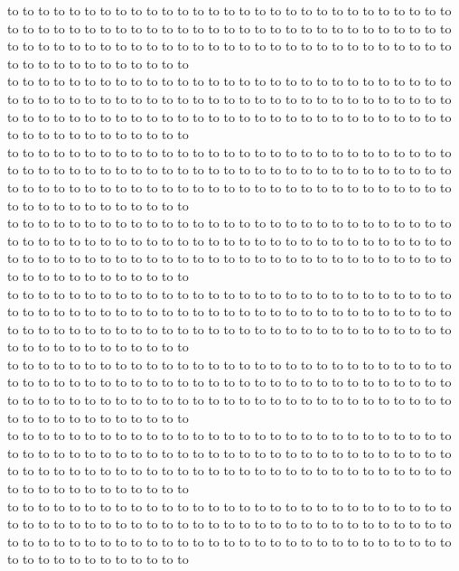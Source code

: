 to to to to to to to to to to to to to to to to to to to to to to to to to to to to to to to to to to to to to to to to to to to to to to to to to to to to to to to to to to to to to to to to to to to to to to to to to to to to to to to to to to to to to to to to to to to to to to to to to to to\\
to to to to to to to to to to to to to to to to to to to to to to to to to to to to to to to to to to to to to to to to to to to to to to to to to to to to to to to to to to to to to to to to to to to to to to to to to to to to to to to to to to to to to to to to to to to to to to to to to to to\\
to to to to to to to to to to to to to to to to to to to to to to to to to to to to to to to to to to to to to to to to to to to to to to to to to to to to to to to to to to to to to to to to to to to to to to to to to to to to to to to to to to to to to to to to to to to to to to to to to to to\\
to to to to to to to to to to to to to to to to to to to to to to to to to to to to to to to to to to to to to to to to to to to to to to to to to to to to to to to to to to to to to to to to to to to to to to to to to to to to to to to to to to to to to to to to to to to to to to to to to to to\\
to to to to to to to to to to to to to to to to to to to to to to to to to to to to to to to to to to to to to to to to to to to to to to to to to to to to to to to to to to to to to to to to to to to to to to to to to to to to to to to to to to to to to to to to to to to to to to to to to to to\\
to to to to to to to to to to to to to to to to to to to to to to to to to to to to to to to to to to to to to to to to to to to to to to to to to to to to to to to to to to to to to to to to to to to to to to to to to to to to to to to to to to to to to to to to to to to to to to to to to to to\\
to to to to to to to to to to to to to to to to to to to to to to to to to to to to to to to to to to to to to to to to to to to to to to to to to to to to to to to to to to to to to to to to to to to to to to to to to to to to to to to to to to to to to to to to to to to to to to to to to to to\\
to to to to to to to to to to to to to to to to to to to to to to to to to to to to to to to to to to to to to to to to to to to to to to to to to to to to to to to to to to to to to to to to to to to to to to to to to to to to to to to to to to to to to to to to to to to to to to to to to to to\\

